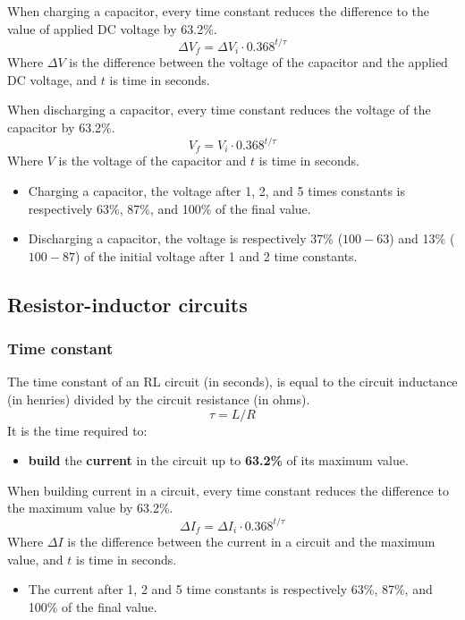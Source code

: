 \documentclass[letterpaper]{article}
\begin{document}
        When charging a capacitor, every time constant reduces the difference to the value of applied DC voltage by 63.2\%.
        $$ \Delta V_f = \Delta V_i \cdot 0.368^{t / \tau} $$
        Where $ \Delta V $ is the difference between the voltage of the capacitor and the applied DC voltage, and $ t $ is time in seconds.

        When discharging a capacitor, every time constant reduces the voltage of the capacitor by 63.2\%.
        $$ V_f = V_i \cdot 0.368^{t / \tau} $$
        Where $ V $ is the voltage of the capacitor and $ t $ is time in seconds.

        \begin{itemize}
            \item Charging a capacitor, the voltage after 1, 2, and 5 times constants is respectively 63\%, 87\%, and 100\% of the final value.
            \item Discharging a capacitor, the voltage is respectively 37\% ($ 100 - 63 $) and 13\% ($ 100 - 87 $) of the initial voltage after 1 and 2 time constants.
        \end{itemize}

        \newpage

        \subsection{Resistor-inductor circuits}
        \subsubsection{Time constant}
        The time constant of an RL circuit (in seconds), is equal to the circuit inductance (in henries) divided by the circuit resistance (in ohms).
        $$ \tau = L / R $$
        It is the time required to:
        \begin{itemize}
            \item \textbf{build} the \textbf{current} in the circuit up to \textbf{63.2\%} of its maximum value.
        \end{itemize}

        When building current in a circuit, every time constant reduces the difference to the maximum value by 63.2\%.
        $$ \Delta I_f = \Delta I_i \cdot 0.368^{t / \tau} $$
        Where $ \Delta I $ is the difference between the current in a circuit and the maximum value, and $ t $ is time in seconds.

        \begin{itemize}
            \item The current after 1, 2 and 5 time constants is respectively 63\%, 87\%, and 100\% of the final value.
        \end{itemize}
\end{document}
